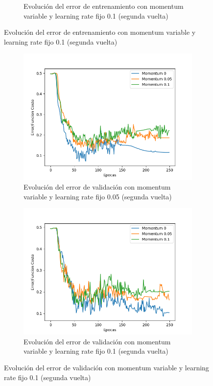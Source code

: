\begin{figure}[!htbp]
\begin{subfigure}{.5\textwidth}
  \caption{Evolución del error de entrenamiento con momentum variable y learning rate fijo 0.1 (segunda vuelta)}
  \label{fig:sub2}
\end{subfigure}
\end{figure}

\begin{figure}[!htbp]
\centering
\begin{subfigure}{.5\textwidth}
  \centering
  \includegraphics[width=1\linewidth]{graficos/eta_x_momentum_promedios_validacion__0.png}
  \caption{Evolución del error de validación con momentum variable y learning rate fijo 0.05 (segunda vuelta)}
  \label{fig:sub1}
\end{subfigure}%
\begin{subfigure}{.5\textwidth}
  \centering
  \includegraphics[width=1\linewidth]{graficos/eta_x_momentum_promedios_validacion__2.png}
  \caption{Evolución del error de validación con momentum variable y learning rate fijo 0.1 (segunda vuelta)}
  \label{fig:sub2}
\end{subfigure}
\end{figure}

